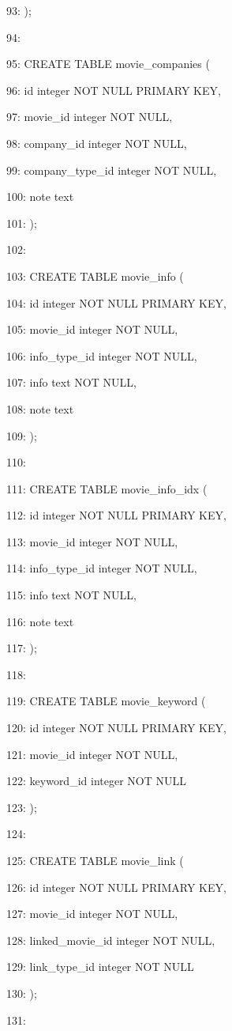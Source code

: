 \documentclass[11pt,a4paper]{article}
\begin{document}
93: );

94:

95: CREATE TABLE movie\_companies (

96:     id integer NOT NULL PRIMARY KEY,

97:     movie\_id integer NOT NULL,

98:     company\_id integer NOT NULL,

99:     company\_type\_id integer NOT NULL,

100:     note text

101: );

102:

103: CREATE TABLE movie\_info (

104:     id integer NOT NULL PRIMARY KEY,

105:     movie\_id integer NOT NULL,

106:     info\_type\_id integer NOT NULL,

107:     info text NOT NULL,

108:     note text

109: );

110:

111: CREATE TABLE movie\_info\_idx (

112:     id integer NOT NULL PRIMARY KEY,

113:     movie\_id integer NOT NULL,

114:     info\_type\_id integer NOT NULL,

115:     info text NOT NULL,

116:     note text

117: );

118:

119: CREATE TABLE movie\_keyword (

120:     id integer NOT NULL PRIMARY KEY,

121:     movie\_id integer NOT NULL,

122:     keyword\_id integer NOT NULL

123: );

124:

125: CREATE TABLE movie\_link (

126:     id integer NOT NULL PRIMARY KEY,

127:     movie\_id integer NOT NULL,

128:     linked\_movie\_id integer NOT NULL,

129:     link\_type\_id integer NOT NULL

130: );

131:
\end{document}

